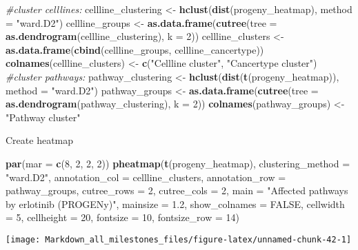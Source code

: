 \documentclass[]{article}
\newenvironment{Shaded}{\begin{snugshade}}{\end{snugshade}}
\newcommand{\CommentTok}[1]{\textcolor[rgb]{0.56,0.35,0.01}{\textit{#1}}}
\newcommand{\DataTypeTok}[1]{\textcolor[rgb]{0.13,0.29,0.53}{#1}}
\newcommand{\DecValTok}[1]{\textcolor[rgb]{0.00,0.00,0.81}{#1}}
\newcommand{\FloatTok}[1]{\textcolor[rgb]{0.00,0.00,0.81}{#1}}
\newcommand{\KeywordTok}[1]{\textcolor[rgb]{0.13,0.29,0.53}{\textbf{#1}}}
\newcommand{\NormalTok}[1]{#1}
\newcommand{\OtherTok}[1]{\textcolor[rgb]{0.56,0.35,0.01}{#1}}
\newcommand{\StringTok}[1]{\textcolor[rgb]{0.31,0.60,0.02}{#1}}
\begin{document}
\begin{Shaded}
\begin{Highlighting}[]
\CommentTok{#cluster celllines:}
\NormalTok{cellline_clustering <-}\StringTok{ }\KeywordTok{hclust}\NormalTok{(}\KeywordTok{dist}\NormalTok{(progeny_heatmap), }\DataTypeTok{method =} \StringTok{"ward.D2"}\NormalTok{)}
\NormalTok{cellline_groups <-}\StringTok{ }\KeywordTok{as.data.frame}\NormalTok{(}\KeywordTok{cutree}\NormalTok{(}\DataTypeTok{tree =} \KeywordTok{as.dendrogram}\NormalTok{(cellline_clustering), }\DataTypeTok{k =} \DecValTok{2}\NormalTok{))}
\NormalTok{cellline_clusters <-}\StringTok{ }\KeywordTok{as.data.frame}\NormalTok{(}\KeywordTok{cbind}\NormalTok{(cellline_groups, cellline_cancertype))}
\KeywordTok{colnames}\NormalTok{(cellline_clusters) <-}\StringTok{ }\KeywordTok{c}\NormalTok{(}\StringTok{"Cellline cluster"}\NormalTok{, }\StringTok{"Cancertype cluster"}\NormalTok{)}
\CommentTok{#cluster pathways:}
\NormalTok{pathway_clustering <-}\StringTok{ }\KeywordTok{hclust}\NormalTok{(}\KeywordTok{dist}\NormalTok{(}\KeywordTok{t}\NormalTok{(progeny_heatmap)), }\DataTypeTok{method =} \StringTok{"ward.D2"}\NormalTok{) }
\NormalTok{pathway_groups <-}\StringTok{ }\KeywordTok{as.data.frame}\NormalTok{(}\KeywordTok{cutree}\NormalTok{(}\DataTypeTok{tree =} \KeywordTok{as.dendrogram}\NormalTok{(pathway_clustering), }\DataTypeTok{k =} \DecValTok{2}\NormalTok{))}
\KeywordTok{colnames}\NormalTok{(pathway_groups) <-}\StringTok{ "Pathway cluster"}
\end{Highlighting}
\end{Shaded}

Create heatmap

\begin{Shaded}
\begin{Highlighting}[]
\KeywordTok{par}\NormalTok{(}\DataTypeTok{mar =} \KeywordTok{c}\NormalTok{(}\DecValTok{8}\NormalTok{, }\DecValTok{2}\NormalTok{, }\DecValTok{2}\NormalTok{, }\DecValTok{2}\NormalTok{))}
\KeywordTok{pheatmap}\NormalTok{(}\KeywordTok{t}\NormalTok{(progeny_heatmap),}
         \DataTypeTok{clustering_method =} \StringTok{"ward.D2"}\NormalTok{,}
         \DataTypeTok{annotation_col =}\NormalTok{ cellline_clusters,}
         \DataTypeTok{annotation_row =}\NormalTok{ pathway_groups,}
         \DataTypeTok{cutree_rows =} \DecValTok{2}\NormalTok{,}
         \DataTypeTok{cutree_cols =} \DecValTok{2}\NormalTok{,}
         \DataTypeTok{main =} \StringTok{"Affected pathways by erlotinib (PROGENy)"}\NormalTok{,}
         \DataTypeTok{mainsize =} \FloatTok{1.2}\NormalTok{, }
         \DataTypeTok{show_colnames =} \OtherTok{FALSE}\NormalTok{,}
         \DataTypeTok{cellwidth =} \DecValTok{5}\NormalTok{,}
         \DataTypeTok{cellheight =} \DecValTok{20}\NormalTok{, }
         \DataTypeTok{fontsize =} \DecValTok{10}\NormalTok{,}
         \DataTypeTok{fontsize_row =} \DecValTok{14}\NormalTok{)}
\end{Highlighting}
\end{Shaded}

\begin{center}\texttt{[image: Markdown\_all\_milestones\_files/figure-latex/unnamed-chunk-42-1]} \end{center}
\end{document}

